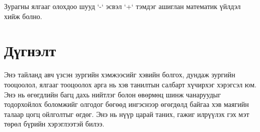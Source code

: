 Зурагны ялгааг олохдоо шууд `-` эсвэл `+` тэмдэг ашиглан математик үйлдэл хийж болно.

\section{Дүгнэлт}

Энэ тайланд авч үзсэн зургийн хэмжээсийг хэвийн болгох, дундаж зургийн тооцоолол, ялгааг тооцоолох арга нь хэв танилтын салбарт хүчирхэг хэрэгсэл юм. Энэ нь өгөгдлийн багц дахь нийтлэг болон өвөрмөц шинж чанаруудыг тодорхойлох боломжийг олгодог бөгөөд ингэснээр өгөгдөлд байгаа хэв маягийн талаар цогц ойлголтыг өгдөг. Энэ нь нүүр царай таних, гажиг илрүүлэх гэх мэт төрөл бүрийн хэрэглээтэй билээ.